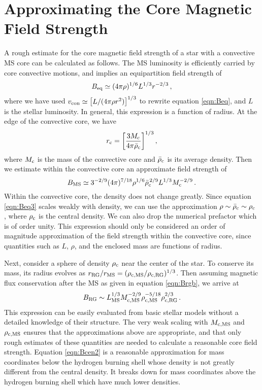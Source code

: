 \section{Approximating the Core Magnetic Field Strength}
\label{Bcenap}

A rough estimate for the core magnetic field strength of a star with a convective MS core can be calculated as follows. The MS luminosity is efficiently carried by core convective motions, and implies an equipartition field strength of 
\begin{equation}
\label{eqn:Beq2}
B_{\rm eq} \simeq (4 \pi \rho)^{1/6} L^{1/3} r^{-2/3} \, ,
\end{equation}
where we have used $v_{\rm con} \simeq \big[L/(4 \pi \rho r^2)\big]^{1/3}$ to rewrite equation \ref{eqn:Beq}, and $L$ is the stellar luminosity. In general, this expression is a function of radius. At the edge of the convective core, we have
\begin{equation}
\label{eqn:rc}
r_{\rm c} = \bigg[ \frac{3 M_{\rm c}}{4 \pi {\bar \rho}_{\rm c}} \bigg]^{1/3} \, ,
\end{equation}
where $M_{\rm c}$ is the mass of the convective core and ${\bar \rho}_{\rm c}$ is its average density. Then we estimate within the convective core an approximate field strength of
\begin{equation}
\label{eqn:Beq3}
B_{\rm MS} \simeq 3^{-2/9} (4 \pi)^{7/18} \rho^{1/6} {\bar \rho}_{\rm c}^{\, 2/9} L^{1/3} M_{\rm c}^{-2/9} \, .
\end{equation}
Within the convective core, the density does not change greatly. Since equation \ref{eqn:Beq3} scales weakly with density, we can use the approximation $\rho \sim {\bar \rho}_{\rm c} \sim \rho_{\rm c}$ , where $\rho_{\rm c}$ is the central density. We can also drop the numerical prefactor which is of order unity. This expression should only be considered an order of magnitude approximation of the field strength within the convective core, since quantities such as $L$, $\rho$, and the enclosed mass are functions of radius.

Next, consider a sphere of density $\rho_{\rm c}$ near the center of the star. To conserve its mass, its radius evolves as $r_{\rm RG}/r_{\rm MS} = (\rho_{\rm c,MS}/\rho_{\rm c,RG})^{1/3}$. Then assuming magnetic flux conservation after the MS as given in equation \ref{eqn:Brgb}, we arrive at 
\begin{equation}
\label{eqn:Bcen2}
B_{\rm RG} \sim L_{\rm MS}^{1/3} M_{\rm c,MS}^{-2/9} \rho_{\rm c,MS}^{-5/18} \rho_{\rm c,RG}^{2/3} \, .
\end{equation}
This expression can be easily evaluated from basic stellar models without a detailed knowledge of their structure. The very weak scaling with $M_{\rm c,MS}$ and $\rho_{\rm c,MS}$ ensures that the approximations above are appropriate, and that only rough estimates of these quantities are needed to calculate a reasonable core field strength. Equation \ref{eqn:Bcen2} is a reasonable approximation for mass coordinates below the hydrogen burning shell whose density is not greatly different from the central density. It breaks down for mass coordinates above the hydrogen burning shell which have much lower densities.
